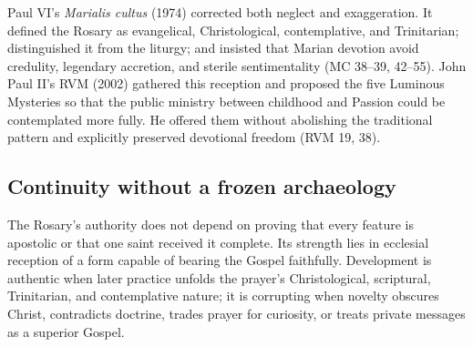 Paul VI's \emph{Marialis cultus} (1974) corrected both neglect and exaggeration. It defined the Rosary as evangelical, Christological, contemplative, and Trinitarian; distinguished it from the liturgy; and insisted that Marian devotion avoid credulity, legendary accretion, and sterile sentimentality (MC 38--39, 42--55). John Paul II's RVM (2002) gathered this reception and proposed the five Luminous Mysteries so that the public ministry between childhood and Passion could be contemplated more fully. He offered them without abolishing the traditional pattern and explicitly preserved devotional freedom (RVM 19, 38).

\subsection{Continuity without a frozen archaeology}

The Rosary's authority does not depend on proving that every feature is apostolic or that one saint received it complete. Its strength lies in ecclesial reception of a form capable of bearing the Gospel faithfully. Development is authentic when later practice unfolds the prayer's Christological, scriptural, Trinitarian, and contemplative nature; it is corrupting when novelty obscures Christ, contradicts doctrine, trades prayer for curiosity, or treats private messages as a superior Gospel.
